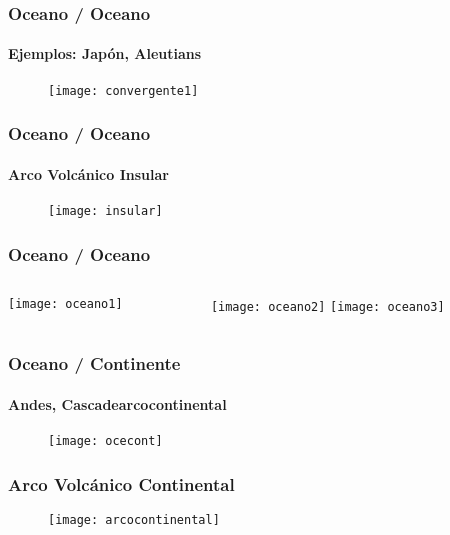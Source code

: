 \documentclass{beamer}
\begin{document}
\begin{frame}
\frametitle{Oceano / Oceano}
\framesubtitle{Ejemplos: Japón, Aleutians}
\begin{center}
\begin{figure}
\texttt{[image: convergente1]}
\end{figure}
\end{center}
\end{frame}
\begin{frame}
\frametitle{Oceano / Oceano}
\framesubtitle{Arco Volcánico Insular}
\begin{center}
\begin{figure}
\texttt{[image: insular]}
\end{figure}
\end{center}
\end{frame}
\begin{frame}
\frametitle{Oceano / Oceano}
\begin{center}
\begin{columns}
		\begin{column}{.5\linewidth}
		 \texttt{[image: oceano1]}
		\end{column}
		\begin{column}{.5\linewidth}
			 \texttt{[image: oceano2]}\vfill
			 \texttt{[image: oceano3]}
		\end{column}
\end{columns}
\end{center}
\end{frame}
\begin{frame}
\frametitle{Oceano / Continente}
\framesubtitle{Andes, Cascadearcocontinental}
\begin{center}
\begin{figure}
\texttt{[image: ocecont]}
\end{figure}
\end{center}
\end{frame}
\begin{frame}
\frametitle{Arco Volcánico Continental}
\begin{center}
\begin{figure}
\texttt{[image: arcocontinental]}
\end{figure}
\end{center}
\end{frame}
\end{document}
